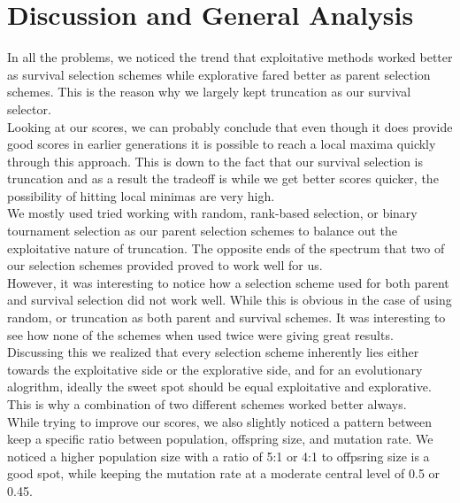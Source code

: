 \documentclass[12pt]{article}
\begin{document}
\newpage

\section{Discussion and General Analysis}

In all the problems, we noticed the trend that exploitative methods worked better as survival selection schemes while explorative fared better as parent selection schemes. This is the reason why we largely kept truncation as our survival selector.
\newline \\
Looking at our scores, we can probably conclude that even though it does provide good scores in earlier generations it is possible to reach a local maxima quickly through this approach. This is down to the fact that our survival selection is truncation and as a result the tradeoff is while we get better scores quicker, the possibility of hitting local minimas are very high. 
\newline \\
We mostly used tried working with random, rank-based selection, or binary tournament selection as our parent selection schemes to balance out the exploitative nature of truncation. The opposite ends of the spectrum that two of our selection schemes provided proved to work well for us. 
\newline \\
However, it was interesting to notice how a selection scheme used for both parent and survival selection did not work well. While this is obvious in the case of using random, or truncation as both parent and survival schemes. It was interesting to see how none of the schemes when used twice were giving great results. Discussing this we realized that every selection scheme inherently lies either towards the exploitative side or the explorative side, and for an evolutionary alogrithm, ideally the sweet spot should be equal exploitative and explorative. This is why a combination of two different schemes worked better always. 
\newline \\
While trying to improve our scores, we also slightly noticed a pattern between keep a specific ratio between population, offspring size, and mutation rate. We noticed a higher population size with a ratio of 5:1 or 4:1 to offpsring size is a good spot, while keeping the mutation rate at a moderate central level of 0.5 or 0.45.
\end{document}
